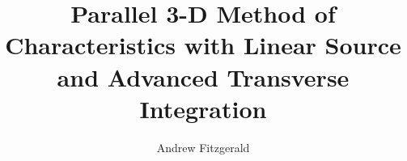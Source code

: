 \documentclass[thesis]{thesis-umich}
\title{Parallel 3-D Method of Characteristics with Linear Source and Advanced Transverse Integration}
\author{Andrew Fitzgerald}
\begin{document}
    \acresetall
    
    
    
    
    
    
    
\end{document}
